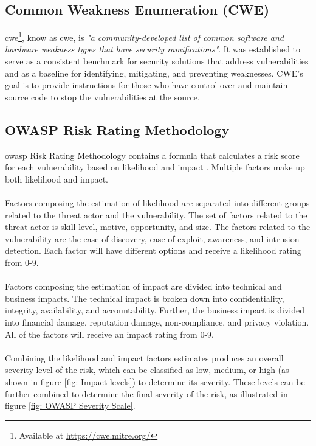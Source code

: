 \subsection{Common Weakness Enumeration (CWE)}
\label{cwe}
\acrlong{cwe}\footnote{Available at \url{https://cwe.mitre.org/}}, know as \acrshort{cwe}, is \textit{"a community-developed list of common software and hardware weakness types that have security ramifications"}\cite{CWE}. It was established to serve as a consistent benchmark for security solutions that address vulnerabilities and as a baseline for identifying, mitigating, and preventing weaknesses. CWE's goal is to provide instructions for those who have control over and maintain source code to stop the vulnerabilities at the source. 

\subsection{OWASP Risk Rating Methodology}
\acrshort{owasp} Risk Rating Methodology contains a formula that calculates a risk score for each vulnerability based on likelihood and impact \cite{owasprisk}. Multiple factors make up both likelihood and impact. 
\\~\\
Factors composing the estimation of likelihood are separated into different groups related to the threat actor and the vulnerability. The set of factors related to the threat actor is skill level, motive, opportunity, and size. The factors related to the vulnerability are the ease of discovery, ease of exploit, awareness, and intrusion detection. Each factor will have different options and receive a likelihood rating from 0-9. 
\\~\\
Factors composing the estimation of impact are divided into technical and business impacts. The technical impact is broken down into confidentiality, integrity, availability, and accountability. Further, the business impact is divided into financial damage, reputation damage, non-compliance, and privacy violation. All of the factors will receive an impact rating from 0-9. 
\\~\\
Combining the likelihood and impact factors estimates produces an overall severity level of the risk, which can be classified as low, medium, or high (as shown in figure \ref{fig: Impact levels}) to determine its severity. These levels can be further combined to determine the final severity of the risk, as illustrated in figure \ref{fig: OWASP Severity Scale}.


